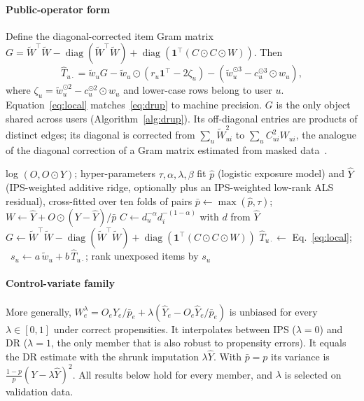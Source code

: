 \documentclass[preprint,review,12pt,authoryear]{elsarticle}
\theoremstyle{definition}
\newcommand{\diag}{\operatorname{diag}}
\newcommand{\tW}{\tilde W}
\begin{document}
\paragraph{Public-operator form}
Define the diagonal-corrected item Gram matrix
$G=\tW^\top\tW-\diag(\tW^\top\tW)+\diag(\mathbf 1^\top(C\odot C\odot W))$. Then
\begin{equation}\label{eq:local}
\hat T_{u\cdot}=\tilde w_uG-\tilde w_u\odot(r_u\mathbf 1^\top-2\zeta_u)-(\tilde w_u^{\odot3}-c_u^{\odot3}\odot w_u),
\end{equation}
where $\zeta_u=\tilde w_u^{\odot2}-c_u^{\odot2}\odot w_u$ and lower-case rows
belong to user $u$. Equation~\eqref{eq:local} matches~\eqref{eq:drup} to machine
precision. $G$ is the only object shared across users
(Algorithm~\ref{alg:drup}). Its off-diagonal entries are products of distinct
edges; its diagonal is corrected from $\sum_u\tW_{ui}^2$ to
$\sum_uC_{ui}^2W_{ui}$, the analogue of the diagonal correction of a Gram
matrix estimated from masked data~\citep{lounici2014}.

\begin{algorithm}[t]
\caption{DRUP (training-free)}\label{alg:drup}
\begin{algorithmic}[1]
\Require log $(O,O\odot Y)$; hyper-parameters $\tau,\alpha,\lambda,\beta$
\State fit $\hat p$ (logistic exposure model) and $\hat Y$ (IPS-weighted additive ridge, optionally plus an IPS-weighted low-rank ALS residual), cross-fitted over ten folds of pairs
\State $\bar p\gets\max(\hat p,\tau)$; \ $W\gets\hat Y+O\odot(Y-\hat Y)/\bar p$
\State $C\gets d_u^{-\alpha}d_i^{-(1-\alpha)}$ with $d$ from $\hat Y$
\State $G\gets\tW^\top\tW-\diag(\tW^\top\tW)+\diag(\mathbf 1^\top(C\odot C\odot W))$ 
\State $\hat T_{u\cdot}\gets$ Eq.~\eqref{eq:local}; \ $s_u\gets a\,\tilde w_u+b\,\hat T_{u\cdot}$; rank unexposed items by $s_u$
\EndFor
\end{algorithmic}
\end{algorithm}

\paragraph{Control-variate family}
More generally, $W^\lambda_e=O_eY_e/\bar p_e+\lambda(\hat Y_e-O_e\hat Y_e/\bar p_e)$
is unbiased for every $\lambda\in[0,1]$ under correct propensities. It
interpolates between IPS ($\lambda=0$) and DR ($\lambda=1$, the only member that
is also robust to propensity errors). It equals the DR estimate with the
shrunk imputation $\lambda\hat Y$. With $\bar p=p$ its variance is
$\frac{1-p}{p}(Y-\lambda\hat Y)^2$. All results below hold for every member, and
$\lambda$ is selected on validation data.
\end{document}
